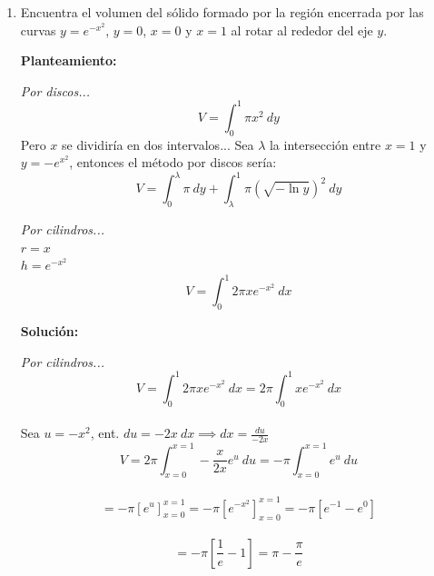 \documentclass[10pt,letterpaper]{article}
\begin{document}
\begin{enumerate}

\item Encuentra el volumen del sólido formado por la región encerrada por las curvas $y=e^{-x^2}$,
      $y=0$, $x=0$ y $x=1$ al rotar al rededor del eje $y$.

\begin{multicols}{2}


\textbf{Planteamiento:}

\textit{Por discos...}
$$V = \int_{0}^{1} \pi x^2\ dy$$
Pero $x$ se dividiría en dos intervalos... Sea $\lambda$ la intersección entre $x=1$ y $y=-e^{x^2}$,
entonces el método por discos sería:\\
$$V = \int_{0}^{\lambda} \pi\ dy + \int_{\lambda}^{1} \pi( \sqrt{-\ln{y}} )^2\ dy $$

\textit{Por cilindros...} \\
$r = x$ \\
$h = e^{-x^2}$
$$V = \int_{0}^{1} 2 \pi x e^{-x^2}\ dx$$

\textbf{Solución:}

\textit{Por cilindros...}
$$V = \int_{0}^{1} 2 \pi x e^{-x^2}\ dx = 2\pi \int_{0}^{1} x e^{-x^2}\ dx$$ \\
Sea $u = -x^2$, ent. $du = -2x\ dx \implies dx = \frac{du}{-2x}$
$$V = 2\pi \int_{x=0}^{x=1} -\frac{x}{2x} e^u\ du = -\pi \int_{x=0}^{x=1} e^u\ du$$ \\
$$= -\pi[e^u]_{x=0}^{x=1} = -\pi[e^{-x^2}]_{x=0}^{x=1} = -\pi[e^{-1}-e^0]$$ \\
$$= -\pi[\frac{1}{e}-1] = \pi - \frac{\pi}{e}$$


\end{multicols}
\end{enumerate}
\end{document}
